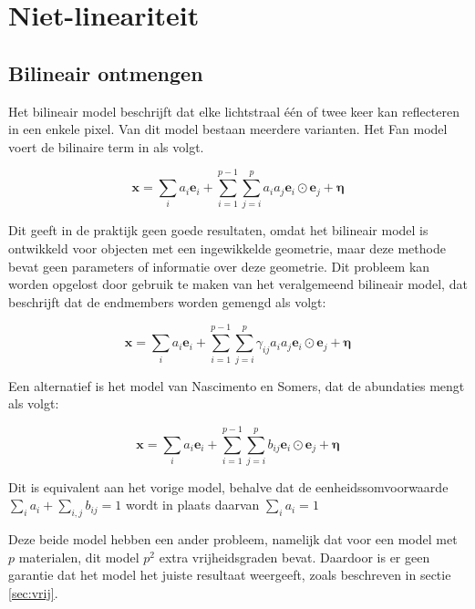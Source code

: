 \documentclass[12pt]{report}
\begin{document}
\chapter{Niet-lineariteit\cite{mlinmix}}


\section{Bilineair ontmengen}

Het bilineair model beschrijft dat elke lichtstraal \'e\'en of twee keer kan reflecteren in een enkele pixel. Van dit model bestaan meerdere varianten. Het Fan model\cite{mlinmix} voert de bilinaire term in als volgt.

\begin{equation}
\bm{x} = \sum_i a_i \bm{e}_i + \sum_{i=1}^{p-1} \sum_{j=i}^{p} a_i a_j \bm{e}_i \odot \bm{e}_j + \bm{\eta}
\end{equation}

Dit geeft in de praktijk geen goede resultaten, omdat het bilineair model is ontwikkeld voor objecten met een ingewikkelde geometrie, maar deze methode bevat geen parameters of informatie over deze geometrie. Dit probleem kan worden opgelost door gebruik te maken van het veralgemeend bilineair model\cite{mlinmix}, dat beschrijft dat de endmembers worden gemengd als volgt:

\begin{equation}
\bm{x} = \sum_i a_i \bm{e}_i + \sum_{i=1}^{p-1} \sum_{j=i}^{p}  \gamma_{ij} a_i a_j \bm{e}_i \odot \bm{e}_j + \bm{\eta}
\end{equation}

Een alternatief is het model van Nascimento en Somers, dat de abundaties mengt als volgt:

\begin{equation}
\bm{x} = \sum_i a_i \bm{e}_i + \sum_{i=1}^{p-1} \sum_{j=i}^{p}  b_{ij} \bm{e}_i \odot \bm{e}_j + \bm{\eta}
\end{equation}

Dit is equivalent aan het vorige model, behalve dat de eenheidssomvoorwaarde $\sum_i a_i + \sum_{i,j} b_{ij} = 1$ wordt in plaats daarvan $\sum_i a_i = 1$

Deze beide model hebben een ander probleem, namelijk dat voor een model met $p$ materialen, dit model $p^2$ extra vrijheidsgraden bevat. Daardoor is er geen garantie dat het model het juiste resultaat weergeeft, zoals beschreven in sectie \ref{sec:vrij}. 
\end{document}

